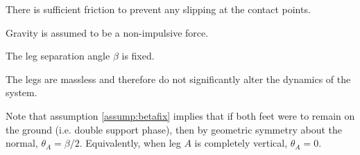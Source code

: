 \begin{assumption}
	There is sufficient friction to prevent any slipping at the contact points. 
\end{assumption}

\begin{assumption}
	Gravity is assumed to be a non-impulsive force. 
\end{assumption}

\begin{assumption} \label{assump:betafix}
	The leg separation angle $\beta$ is fixed.
\end{assumption}

\begin{assumption} \label{assump:massless}
	The legs are massless and therefore do not significantly alter the dynamics of the system. 
\end{assumption}

\hrulefill

Note that assumption \ref{assump:betafix} implies that if both feet were to remain on the ground (i.e. double support phase), then by geometric symmetry about the normal, $\theta _A = \beta/2$. Equivalently, when leg $A$ is completely vertical, $\theta _A = 0$.

